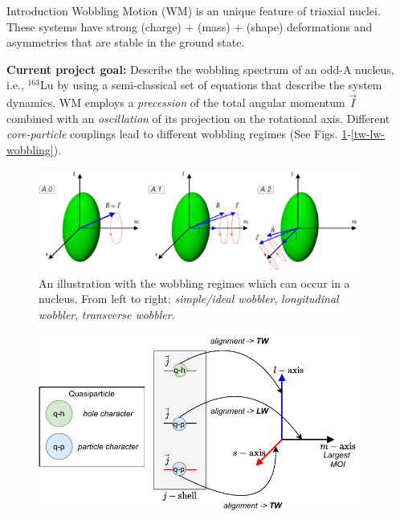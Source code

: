 \documentclass[final]{beamer}
\newlength{\sepwidth}
\newlength{\colwidth}
\newcommand{\separatorcolumn}{\begin{column}{\sepwidth}\end{column}}
\begin{document}
\begin{frame}[t]
\begin{columns}[t]
\separatorcolumn
\begin{column}{\colwidth}
  \begin{block}{Introduction}
Wobbling Motion (WM) is an unique feature of triaxial nuclei. These systems have strong (charge) + (mass) + (shape) deformations and asymmetries that are stable in the ground state.

\textbf{Current project goal:} Describe the wobbling spectrum of an odd-A nucleus, i.e., $^{163}$Lu by using a semi-classical set of equations that describe the system dynamics.
  WM employs a \emph{precession} of the total angular momentum $\vec{I}$ combined with an \emph{oscillation} of its projection on the rotational axis. Different \emph{core-particle} couplings lead to different wobbling regimes (See Figs. \ref{wobbling-regimes}-\ref{tw-lw-wobbling}).
  \begin{figure}
      \centering
     \includegraphics[scale=1.5]{images/wobbling_Regimes_COUPLING_SCHEME.pdf}
      \caption{An illustration with the wobbling regimes which can occur in a nucleus. From left to right: \emph{simple/ideal wobbler}, \emph{longitudinal wobbler}, \emph{transverse wobbler}.}
      \label{wobbling-regimes}
  \end{figure}
  \begin{figure}
      \centering
     \includegraphics[scale=2.3]{images/wobbling_Regimes_updated.pdf}

\end{figure}
\end{block}
\end{column}
\end{columns}
\end{frame}
\end{document}
